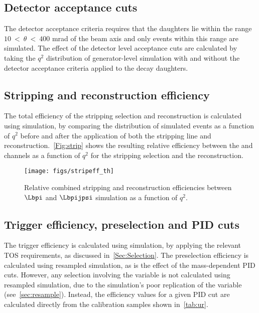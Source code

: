 \subsection{Detector acceptance cuts}
The detector acceptance criteria requires that the daughters lie within the range $10~<~\theta~<~400$ mrad of the beam axis and only events within this range are simulated.  The effect of the detector level acceptance cuts are calculated by taking the $q^{2}$ distribution of generator-level simulation with and without the detector acceptance criteria applied to the decay daughters. 



\subsection{Stripping and reconstruction efficiency}\label{Sec:stripeff}
The total efficiency of the stripping selection and reconstruction is calculated using \Lbpi simulation, by comparing the distribution of simulated events as a function of $q^{2}$ before and after the application of both the stripping line and reconstruction.~\autoref{Fig:strip} shows the resulting relative efficiency between the \Lbpi and \Lbpijpsi channels as a function of $q^{2}$ for the stripping selection and the reconstruction.
\begin{figure}[h]
  \centering
  \texttt{[image: figs/stripeff\_th]}%
  \caption{Relative combined stripping and reconstruction efficiencies between $\Lbpi$ and $\Lbpijpsi$ simulation as a function of $q^{2}$.}
  \label{Fig:strip}
\end{figure}


\subsection{Trigger efficiency, preselection and PID cuts}
The trigger efficiency is calculated using simulation, by applying the relevant TOS requirements, as discussed in~\autoref{Sec:Selection}. The preselection efficiency is calculated using resampled simulation, as is the effect of the mass-dependent PID cuts. However, any selection involving the \dllpk variable is not calculated using resampled simulation, due to the simulation's poor replication of the \dllpk variable (see~\autoref{sec:resample}). Instead, the efficiency values for a given PID cut are calculated directly from the calibration samples shown in~\autoref{tab:ur}.

